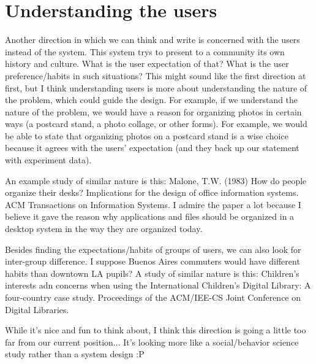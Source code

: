 \documentclass{article}
\begin{document}
\section{Understanding the users}


Another direction in which we can think and write is concerned with the users instead of the system. This system trys to present to a community its own history and culture. What is the user expectation of that? What is the user preference/habits in such situations? This might sound like the first direction at first, but I think understanding users is more about understanding the nature of the problem, which could guide the design. For example, if we understand the nature of the problem, we would have a reason for organizing photos in certain ways (a postcard stand, a photo collage, or other forms). For example, we would be able to state that organizing photos on a postcard stand is a wise choice because it agrees with the users' expectation (and they back up our statement with experiment data).

An example study of similar nature is this: Malone, T.W. (1983) How do people organize their desks? Implications for the design of office information systems. ACM Transactions on Information Systems. I admire the paper a lot because I believe it gave the reason why applications and files should be organized in a desktop system in the way they are organized today.

Besides finding the expectations/habits of groups of users, we can also look for inter-group difference. I suppose Buenos Aires commuters would have different habits than downtown LA pupils? A study of similar nature is this: Children's interests adn concerns when using the International Children's Digital Library: A four-country case study. Proceedings of the ACM/IEE-CS Joint Conference on Digital Libraries.

While it's nice and fun to think about, I think this direction is going a little too far from our current position... It's looking more like a social/behavior science study rather than a system design :P
\end{document}
